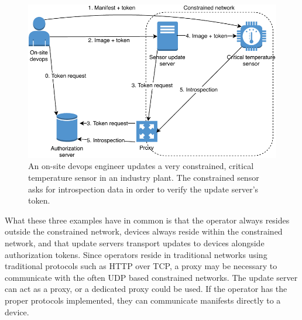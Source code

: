 \documentclass[0-thesis.tex]{subfiles}
\begin{document}
\begin{figure}
    \caption{An on-site devops engineer updates a very constrained, critical temperature
                sensor in an industry plant. The constrained sensor asks for introspection
                data in order to verify the update server's token.}
    \label{fig:industry}
    \includegraphics{images/use-case-industry.pdf}
\end{figure}

What these three examples have in common is that the operator always resides outside the
constrained network, devices always reside within the constrained network, and that
update servers transport updates to devices alongside authorization tokens. Since operators
reside in traditional networks using traditional protocols such as HTTP over TCP, a proxy
may be necessary to communicate with the often UDP based constrained networks. The update
server can act as a proxy, or a dedicated proxy could be used. If the operator has the
proper protocols implemented, they can communicate manifests directly to a device.
\end{document}
